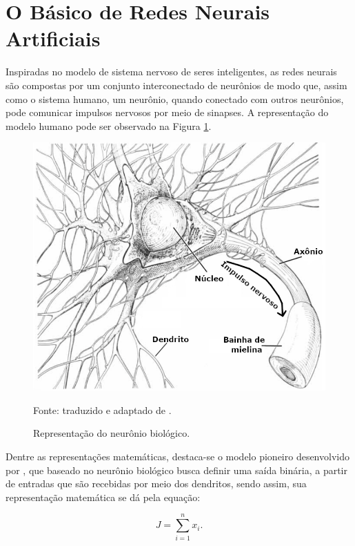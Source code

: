 \newpage
\clearpage

\section{O Básico de Redes Neurais Artificiais}
\label{deep}
Inspiradas no modelo de sistema nervoso de seres inteligentes, as redes neurais são compostas por um conjunto interconectado de neurônios de modo que, assim como o sistema humano, um neurônio, quando conectado com outros neurônios, pode comunicar impulsos nervosos por meio de sinapses. A representação do modelo humano pode ser observado na Figura \ref{deep:fig:1}.

\begin{figure}[H]
    \centering
    \caption{Representação do neurônio biológico.}
    \includegraphics[width=1\linewidth]{recursos/imagens/deep/neuronio.png}
    \label{deep:fig:1}

    Fonte: traduzido e adaptado de \cite{Stevens1979}.
\end{figure}

Dentre as representações matemáticas, destaca-se o modelo pioneiro desenvolvido por \cite{mcculloch1943logical}, que baseado no neurônio biológico busca definir uma saída binária, a partir de entradas que são recebidas por meio dos dendritos, sendo assim, sua representação matemática se dá pela equação:

\begin{equation}
    \label{deep:eq:1}
    J = \sum_{i = 1}^{n} x_i.
\end{equation}

